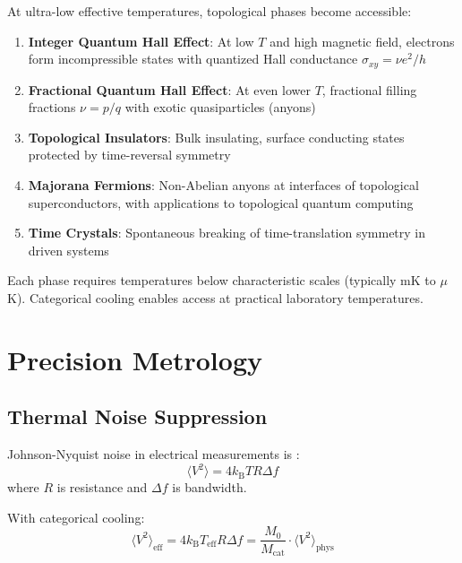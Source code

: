 \documentclass[twocolumn,10pt,twoside]{article}
\newcommand{\kb}{k_{\mathrm{B}}}
\newcommand{\Teff}{T_{\mathrm{eff}}}
\newcommand{\Mcat}{M_{\mathrm{cat}}}
\begin{document}
At ultra-low effective temperatures, topological phases become accessible:

\begin{enumerate}
    \item \textbf{Integer Quantum Hall Effect}: At low $T$ and high magnetic field, electrons form incompressible states with quantized Hall conductance $\sigma_{xy} = \nu e^2/h$ \cite{klitzing1980}

    \item \textbf{Fractional Quantum Hall Effect}: At even lower $T$, fractional filling fractions $\nu = p/q$ with exotic quasiparticles (anyons) \cite{tsui1982,laughlin1983}

    \item \textbf{Topological Insulators}: Bulk insulating, surface conducting states protected by time-reversal symmetry \cite{kane2005,bernevig2006}

    \item \textbf{Majorana Fermions}: Non-Abelian anyons at interfaces of topological superconductors, with applications to topological quantum computing \cite{kitaev2001,nayak2008}

    \item \textbf{Time Crystals}: Spontaneous breaking of time-translation symmetry in driven systems \cite{wilczek2012,zhang2017}
\end{enumerate}

Each phase requires temperatures below characteristic scales (typically mK to $\mu$K). Categorical cooling enables access at practical laboratory temperatures.

\section{Precision Metrology}

\subsection{Thermal Noise Suppression}

Johnson-Nyquist noise in electrical measurements is \cite{johnson1928,nyquist1928}:
\begin{equation}
\langle V^2 \rangle = 4\kb T R \Delta f
\label{eq:johnson_noise}
\end{equation}
where $R$ is resistance and $\Delta f$ is bandwidth.

With categorical cooling:
\begin{equation}
\langle V^2 \rangle_{\text{eff}} = 4\kb \Teff R \Delta f = \frac{M_0}{\Mcat} \cdot \langle V^2 \rangle_{\text{phys}}
\label{eq:cat_noise}
\end{equation}
\end{document}
